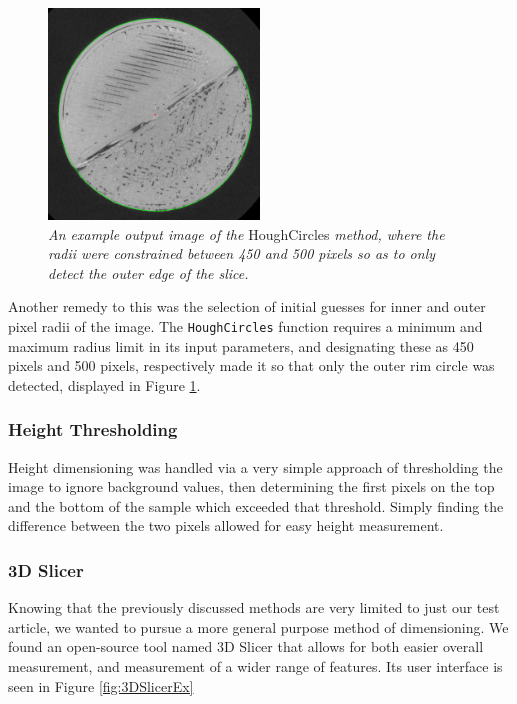 \documentclass[11pt, letterpaper]{article}
\begin{document}
        \begin{figure}[H]
            \centering
            \includegraphics[width=0.5\textwidth]{HoughCirclesTest.PNG}
            \caption{\emph{An example output image of the} HoughCircles \emph{method, where the radii were constrained between 450 and 500 pixels so as to only detect the outer edge of the slice.}}
            \label{fig:HCT}
        \end{figure}
           
        Another remedy to this was the selection of initial guesses for inner and outer pixel radii of the image. The \verb|HoughCircles| function requires a minimum and maximum radius limit in its input parameters, and designating these as 450 pixels and 500 pixels, respectively made it so that only the outer rim circle was detected, displayed in Figure \ref{fig:HCT}.

    \subsubsection{Height Thresholding}
    Height dimensioning was handled via a very simple approach of thresholding the image to ignore background values, then determining the first pixels on the top and the bottom of the sample which exceeded that threshold. Simply finding the difference between the two pixels allowed for easy height measurement.

    \subsubsection{3D Slicer}
    Knowing that the previously discussed methods are very limited to just our test article, we wanted to pursue a more general purpose method of dimensioning. We found an open-source tool named 3D Slicer that allows for both easier overall measurement, and measurement of a wider range of features. Its user interface is seen in Figure \ref{fig:3DSlicerEx}
\end{document}
